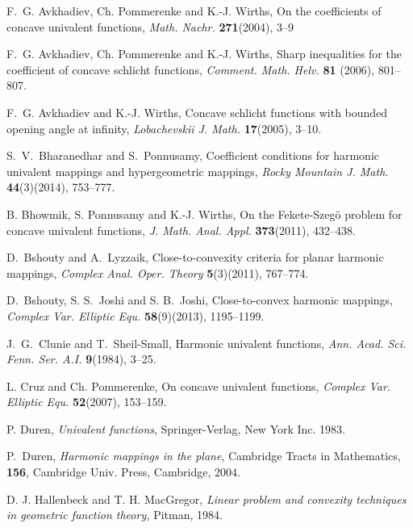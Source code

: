 \documentclass[a4paper,12pt]{amsart}
\theoremstyle{definition}
\begin{document}
\begin{thebibliography}{150}

 F.~G. Avkhadiev, Ch. Pommerenke and K.-J. Wirths,
On the coefficients of concave univalent functions,
\textit{Math. Nachr.} \textbf{271}(2004), 3--9

 F.~G. Avkhadiev, Ch. Pommerenke and K.-J. Wirths,
Sharp inequalities for the coefficient of concave schlicht functions,
\textit{Comment. Math. Helv.} {\bf 81} (2006), 801--807.

 F.~G. Avkhadiev and K.-J. Wirths,
Concave schlicht functions with bounded opening angle at infinity,
\textit{Lobachevskii J. Math.} {\bf 17}(2005), 3--10.

 S.~V.~Bharanedhar and S.~Ponnusamy,
\textrm{Coefficient conditions for harmonic univalent mappings and hypergeometric mappings},
\textit{Rocky Mountain J. Math.} \textbf{44}(3)(2014), 753--777.

 B. Bhowmik, S. Ponnusamy and K.-J. Wirths,
On the Fekete-Szeg\"o problem for concave univalent functions,
\textit{J. Math. Anal. Appl.} {\bf 373}(2011), 432--438.

 D.~Bshouty and A.~Lyzzaik,
\textrm{Close-to-convexity criteria for planar harmonic mappings},
\textit{Complex Anal. Oper. Theory} \textbf{5}(3)(2011), 767--774.

 D.~Bshouty, S. S.~Joshi and S. B.~Joshi,
\textrm{Close-to-convex harmonic mappings},
\textit{Complex Var. Elliptic Equ. } \textbf{58}(9)(2013), 1195--1199.

 J.~G.~Clunie and T.~Sheil-Small,
\textrm{Harmonic univalent functions},
\textit{Ann. Acad. Sci. Fenn. Ser. A.I.} {\bf 9}(1984), 3--25.

 L. Cruz and Ch. Pommerenke,
On concave univalent functions,
\textit{Complex Var. Elliptic Equ.} {\bf 52}(2007), 153--159.

 P. Duren, {\em Univalent functions},
Springer-Verlag, New York Inc. 1983.

 P.~Duren,
\emph{Harmonic mappings in the plane},
Cambridge Tracts in Mathematics,
\textbf{156}, Cambridge Univ. Press, Cambridge, 2004.

 D. J. Hallenbeck and T. H. MacGregor,
\textit{Linear problem and convexity techniques in geometric
function theory,} Pitman, 1984.


\end{thebibliography}
\end{document}
